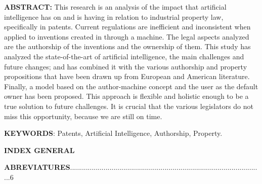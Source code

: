 \documentclass[12pt]{article}
\begin{document}
\vspace{\baselineskip}
\begin{justify}
\textbf{ABSTRACT:} This research is an analysis of the impact that artificial intelligence has on and is having in relation to industrial property law, specifically in patents. Current regulations are inefficient and inconsistent when applied to inventions created in through a machine. The legal aspects analyzed are the authorship of the inventions and the ownership of them. This study has analyzed the state-of-the-art of artificial intelligence, the main challenges and future changes; and has combined it with the various authorship and property propositions that have been drawn up from European and American literature. Finally, a model based on the author-machine concept and the user as the default owner has been proposed. This approach is flexible and holistic enough to be a true solution to future challenges. It is crucial that the various legislators do not miss this opportunity, because we are still on time.
\end{justify}\par


\vspace{\baselineskip}

\vspace{\baselineskip}
\begin{justify}
{\fontsize{10pt}{12.0pt}\selectfont \textbf{KEYWORDS}: Patents, Artificial Intelligence, Authorship, Property. \par}
\end{justify}\par


\vspace{\baselineskip}

\vspace{\baselineskip}

\vspace{\baselineskip}

\vspace{\baselineskip}
\begin{Center}
{\fontsize{16pt}{19.2pt}\selectfont \textbf{INDEX GENERAL}\par}
\end{Center}\par


\vspace{\baselineskip}

\vspace{\baselineskip}
\begin{justify}
\textbf{ABREVIATURES}..................................................................................................6
\end{justify}\par
\end{document}
